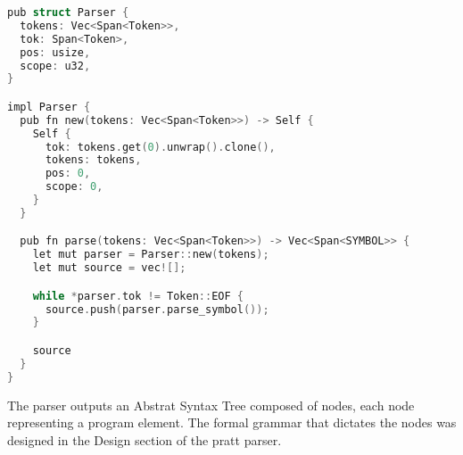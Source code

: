\begin{lstlisting}[language=C]
pub struct Parser {
  tokens: Vec<Span<Token>>,
  tok: Span<Token>,
  pos: usize,
  scope: u32,
}

impl Parser {
  pub fn new(tokens: Vec<Span<Token>>) -> Self {
    Self {
      tok: tokens.get(0).unwrap().clone(),
      tokens: tokens,
      pos: 0,
      scope: 0,
    }
  }

  pub fn parse(tokens: Vec<Span<Token>>) -> Vec<Span<SYMBOL>> {
    let mut parser = Parser::new(tokens);
    let mut source = vec![];

    while *parser.tok != Token::EOF {
      source.push(parser.parse_symbol());
    }

    source
  }
}  
\end{lstlisting}

The parser outputs an Abstrat Syntax Tree composed of nodes, each node representing a program element. The formal grammar that dictates the nodes was designed in the Design section of the pratt parser.

